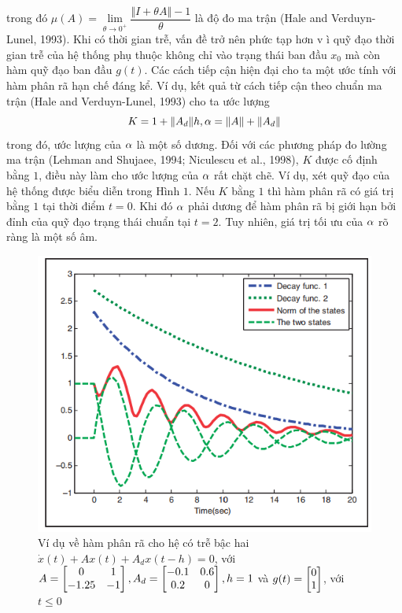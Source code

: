trong đó $\mu (A) = \lim\limits_{\theta \to 0^+}\dfrac{\Vert I + \theta A\Vert -1}{\theta}$ là độ đo ma trận (Hale and Verduyn-Lunel, 1993).
%
Khi có thời gian trễ, vấn đề trở nên phức tạp hơn v ì quỹ đạo thời gian trễ của hệ thống phụ thuộc không chỉ vào trạng thái ban đầu $x_0$ mà còn hàm quỹ đạo ban đầu  $g(t)$. Các cách tiếp cận hiện đại cho ta một ước tính với hàm phân rã hạn chế đáng kể. Ví dụ, kết quả từ cách tiếp cận theo chuẩn ma trận (Hale and Verduyn-Lunel, 1993) cho ta ước lượng
%
\begin{equation}\label{4}
	K = 1 + \Vert A_d \Vert h, \alpha = \Vert A \Vert + \Vert A_d \Vert
\end{equation}
%
trong đó, ước lượng của $\alpha$ là một số dương. Đối với các phương pháp đo lường ma trận (Lehman and Shujaee, 1994; Niculescu et al., 1998), $K$ được cố định bằng $1$, điều này làm cho ước lượng của $\alpha$ rất chặt chẽ. Ví dụ, xét quỹ đạo của hệ thống được biểu diễn trong Hình $1$. Nếu $K$ bằng $1$ thì hàm phân rã có giá trị bằng $1$ tại thời điểm $t=0$. Khi đó $\alpha$ phải dương để hàm phân rã bị giới hạn bởi đỉnh của quỹ đạo trạng thái chuẩn tại $t = 2$. Tuy nhiên, giá trị tối ưu của $\alpha$ rõ ràng là một số âm.
\begin{figure}[h!]
	\centering
	\includegraphics[scale= 0.7]{"./Hinh/Hinh11"}
	\caption[Ví dụ về hàm phân rã cho hệ có trễ bậc hai $\dot{x}(t) + Ax(t) + A_dx(t-h)= 0$, với $A = \m{0& 1\\ -1.25& -1}, A_d= \m{-0.1&0.6 \\ 0.2&0}, h = 1$ và $g(t)= \m{0\\1}$, với $t \le 0$]{Ví dụ về hàm phân rã cho hệ có trễ bậc hai $\dot{x}(t) + Ax(t) + A_dx(t-h)= 0$, với $A = \m{0& 1\\ -1.25& -1}, A_d= \m{-0.1&0.6 \\ 0.2&0}, h = 1$ và $g(t)= \m{0\\1}$, với $t \le 0$}
	\label{fig:hinh-11}
\end{figure}
